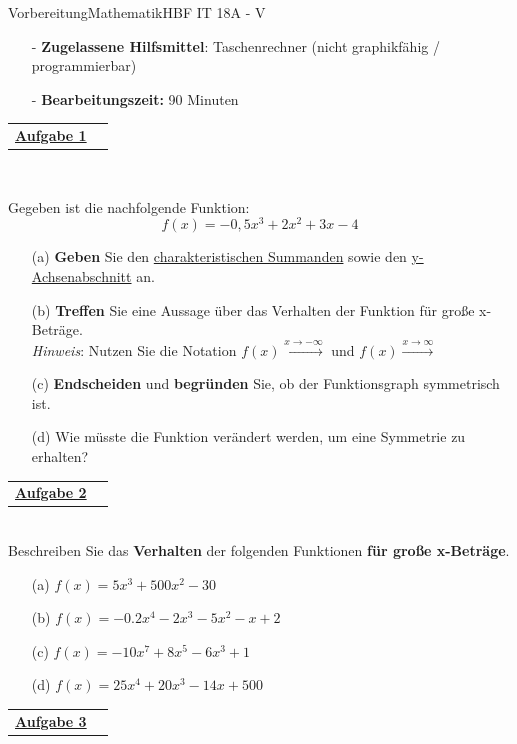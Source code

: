 \documentclass[oneside,openany,headings=optiontotoc,11pt,numbers=noenddot]{scrreprt}
\begin{document}
\begin{test}{Vorbereitung}{Mathematik}{HBF IT 18A - V}
\begin{framed}
{\begin{itemize}[noitemsep,topsep=0pt]
				\item[-] \textbf{Zugelassene Hilfsmittel}: Taschenrechner (nicht graphikfähig / programmierbar)
				\item[-] \textbf{Bearbeitungszeit:} 90 Minuten
			\end{itemize}}
		\end{framed}
		\normalsize
			\noindent
		\begin{tabularx}{\textwidth}{Xl}\underline{\textbf{Aufgabe 1}}& \end{tabularx}\\
		\par\noindent
		Gegeben ist die nachfolgende Funktion: \[f(x) = -0,5x^3 + 2x^2 + 3x - 4\]
		\begin{itemize}
			\item[(a)] \textbf{Geben} Sie den \underline{charakteristischen Summanden} sowie den \underline{y-Achsenabschnitt} an.
			\item[(b)] \textbf{Treffen} Sie eine Aussage über das Verhalten der Funktion für große x-Beträge.\\
			\footnotesize{\textit{Hinweis}: Nutzen Sie die Notation \(f(x)\xrightarrow{x\rightarrow-\infty}\) und \(f(x)\xrightarrow{x\rightarrow\infty}\)}\normalsize
			\item[(c)] \textbf{Endscheiden} und \textbf{begründen} Sie, ob der Funktionsgraph symmetrisch ist.
			\item[(d)] Wie müsste die Funktion verändert werden, um eine Symmetrie zu erhalten?
		\end{itemize}
		\par\noindent
		\begin{tabularx}{\textwidth}{Xl}\underline{\textbf{Aufgabe 2}}&\end{tabularx}\\
		Beschreiben Sie das \textbf{Verhalten} der folgenden Funktionen \textbf{für große x-Beträge}.
		\begin{itemize}
			\item[(a)] \(f(x) = 5x^{3} + 500x^{2} - 30\)
			\item[(b)] \(f(x) = -0.2x^{4} - 2x^{3} - 5x^{2} - x + 2\)
			\item[(c)] \(f(x) = -10x^{7} + 8x^{5} - 6x^{3} + 1\)
			\item[(d)] \(f(x) = 25x^{4} + 20x^{3} - 14x + 500\)
		\end{itemize}
		\noindent
		\begin{tabularx}{\textwidth}{Xl}\underline{\textbf{Aufgabe 3}}&\end{tabularx}\\

\end{test}
\end{document}

